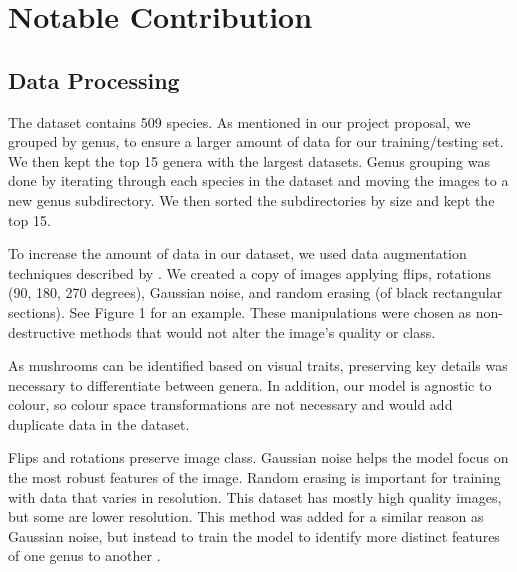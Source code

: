\documentclass{article} %
\begin{document}
\FloatBarrier

\section{Notable Contribution}
\label{sec:notable_contribution}

\subsection{Data Processing}

The dataset contains 509 species. As mentioned in our project proposal, we grouped by genus, to ensure a larger amount of data for our training/testing set. We then kept the top 15 genera with the largest datasets. Genus grouping was done by iterating through each species in the dataset and moving the images to a new genus subdirectory. We then sorted the subdirectories by size and kept the top 15.

To increase the amount of data in our dataset, we used data augmentation techniques described by \cite{ShortenKhoshgoftaar.SurveyImageData.2019}. We created a copy of images applying flips, rotations (90, 180, 270 degrees), Gaussian noise, and random erasing (of black rectangular sections). See Figure 1 for an example. These manipulations were chosen as non-destructive methods that would not alter the image's quality or class.

As mushrooms can be identified based on visual traits, preserving key details was necessary to differentiate between genera. In addition, our model is agnostic to colour, so colour space transformations are not necessary and would add duplicate data in the dataset.

Flips and rotations preserve image class. Gaussian noise helps the model focus on the most robust features of the image. Random erasing is important for training with data that varies in resolution. This dataset has mostly high quality images, but some are lower resolution. This method was added for a similar reason as Gaussian noise, but instead to train the model to identify more distinct features of one genus to another \citep{ShortenKhoshgoftaar.SurveyImageData.2019}.

\FloatBarrier
\end{document}
